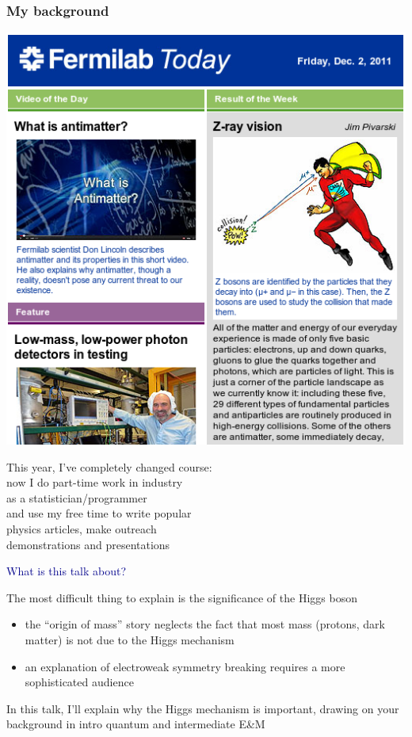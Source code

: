 \documentclass[compress]{beamer}
\begin{document}
\begin{frame}
\frametitle{My background}

\vspace{-0.75 cm} \hfill \includegraphics[width=4 cm]{fermilab_today.png}

\vspace{-3.5 cm}
This year, I've completely changed course: \\\vspace{0.1 cm}
\hspace{0.5 cm} now I do part-time work in industry \\
\hspace{1 cm} as a statistician/programmer \\
\hspace{0.5 cm} and use my free time to write popular \\
\hspace{1 cm} physics articles, make outreach \\
\hspace{1 cm} demonstrations and presentations

\vfill
\hspace{-0.83 cm} \textcolor{darkblue}{\Large What is this talk about?}

\vspace{0.3 cm}
The most difficult thing to explain is the significance of the Higgs boson
\begin{itemize}
\item the ``origin of mass'' story neglects the fact that most mass (protons, dark matter) is not due to the Higgs mechanism
\item an explanation of electroweak symmetry breaking requires a more sophisticated audience
\end{itemize}

In this talk, I'll explain why the Higgs mechanism is important, drawing on your background in intro quantum and intermediate E\&M
\end{frame}
\end{document}
